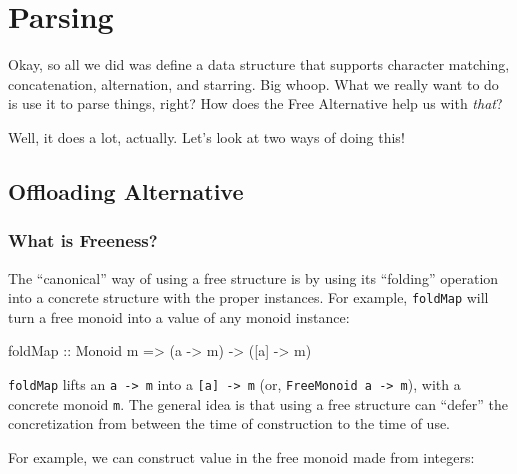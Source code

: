 \documentclass[]{article}
\newenvironment{Shaded}{}{}
\newcommand{\DataTypeTok}[1]{\textcolor[rgb]{0.56,0.13,0.00}{#1}}
\newcommand{\FunctionTok}[1]{\textcolor[rgb]{0.02,0.16,0.49}{#1}}
\newcommand{\NormalTok}[1]{#1}
\newcommand{\OtherTok}[1]{\textcolor[rgb]{0.00,0.44,0.13}{#1}}
\begin{document}
\section{Parsing}\label{parsing}

Okay, so all we did was define a data structure that supports character
matching, concatenation, alternation, and starring. Big whoop. What we really
want to do is use it to parse things, right? How does the Free Alternative help
us with \emph{that}?

Well, it does a lot, actually. Let's look at two ways of doing this!

\subsection{Offloading Alternative}\label{offloading-alternative}

\subsubsection{What is Freeness?}\label{what-is-freeness}

The ``canonical'' way of using a free structure is by using its ``folding''
operation into a concrete structure with the proper instances. For example,
\texttt{foldMap} will turn a free monoid into a value of any monoid instance:

\begin{Shaded}
\begin{Highlighting}[]
\FunctionTok{foldMap}\OtherTok{ ::} \DataTypeTok{Monoid}\NormalTok{ m }\OtherTok{=\textgreater{}}\NormalTok{ (a }\OtherTok{{-}\textgreater{}}\NormalTok{ m) }\OtherTok{{-}\textgreater{}}\NormalTok{ ([a] }\OtherTok{{-}\textgreater{}}\NormalTok{ m)}
\end{Highlighting}
\end{Shaded}

\texttt{foldMap} lifts an \texttt{a\ -\textgreater{}\ m} into a
\texttt{{[}a{]}\ -\textgreater{}\ m} (or,
\texttt{FreeMonoid\ a\ -\textgreater{}\ m}), with a concrete monoid \texttt{m}.
The general idea is that using a free structure can ``defer'' the concretization
from between the time of construction to the time of use.

For example, we can construct value in the free monoid made from integers:
\end{document}
